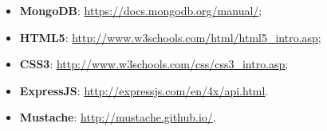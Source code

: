 \begin{itemize}
\item\textbf{ MongoDB}: \url{https://docs.mongodb.org/manual/};
\item \textbf{HTML5}: \url{http://www.w3schools.com/html/html5_intro.asp};
\item \textbf{CSS3}: \url{http://www.w3schools.com/css/css3_intro.asp};

\item \textbf{ExpressJS}: \url{http://expressjs.com/en/4x/api.html}.

\item \textbf{Mustache}: \url{http://mustache.github.io/}.
\end{itemize}


